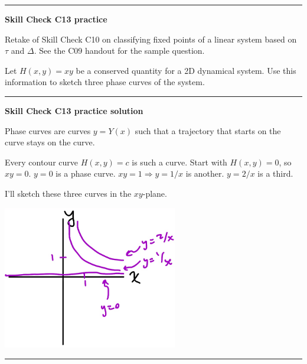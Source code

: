 \documentclass[12pt,letterpaper,noanswers]{exam}
\begin{document}
\vspace{0.2cm}
\hrule
\vspace{0.2cm}

\noindent\textbf{Skill Check C13 practice}
\begin{questions}

\item Retake of Skill Check C10 on classifying fixed points of a linear system based on $\tau$ and $\Delta$.  See the C09 handout for the sample question.

\item Let $H(x,y) = xy$ be a conserved quantity for a 2D dynamical system.  Use this information to sketch three phase curves of the system.
\end{questions}

\vspace{0.2cm}

\hrule
\vspace{0.2cm}

\noindent\textbf{Skill Check C13 practice solution}

Phase curves are curves $y=Y(x)$ such that a trajectory that starts on the curve stays on the curve.

Every contour curve $H(x,y) = c$ is such a curve.  Start with $H(x,y) = 0$, so $xy = 0$.  $y = 0$ is a phase curve.  $xy = 1 \Rightarrow y = 1/x$ is another.  $y = 2/x$ is a third.

I'll sketch these three curves in the $xy$-plane.

\includegraphics[width=3in]{img/C12curves.png}

\vspace{0.2cm}
\hrule
\vspace{0.2cm}
\end{document}
